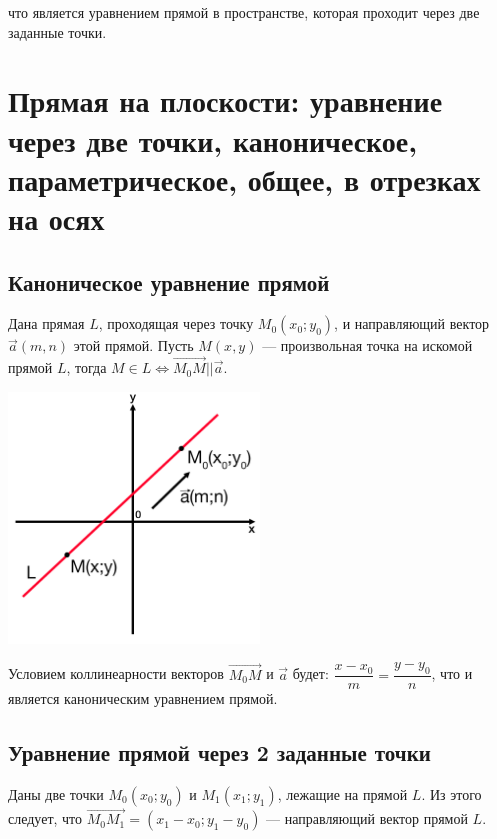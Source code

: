 \documentclass[12pt, fleqn]{extarticle}
\begin{document}
что является уравнением прямой в пространстве, которая проходит через две заданные точки.

\newpage

\section{Прямая на плоскости: уравнение через две точки, каноническое, параметрическое, общее, в отрезках на осях}\label{sec:line_on_plane}

\subsection*{Каноническое уравнение прямой}

Дана прямая \(L\), проходящая через точку \(M_0(x_0;y_0)\), и направляющий вектор \(\overrightarrow{a}(m, n)\) этой прямой.
Пусть \(M(x, y)\) — произвольная точка на искомой прямой \(L\), тогда \(M \in L \iff \overrightarrow{M_0M} || \overrightarrow{a}\).

\begin{center}
    \includegraphics[width=0.5\textwidth]{kanon_line.png}
\end{center}

Условием коллинеарности векторов \(\overrightarrow{M_0M}\) и \(\overrightarrow{a}\) будет:
\(\dfrac{x - x_0}{m} = \dfrac{y - y_0}{n}\), что и является каноническим уравнением прямой.

\subsection*{Уравнение прямой через 2 заданные точки}

Даны две точки \(M_0(x_0;y_0)\) и \(M_1(x_1;y_1)\), лежащие на прямой \(L\).
Из этого следует, что \(\overrightarrow{M_0M_1} = (x_1 - x_0; y_1 - y_0)\) — направляющий вектор прямой \(L\).
\end{document}
